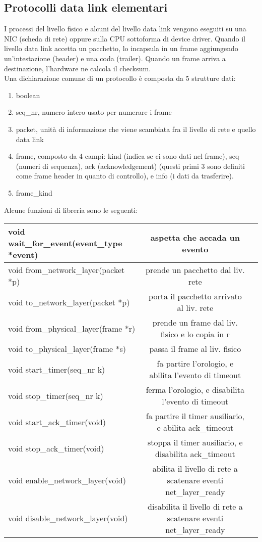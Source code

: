 \documentclass{article}
\begin{document}
\subsection{Protocolli data link elementari}
I processi del livello fisico e alcuni del livello data link vengono eseguiti su una NIC (scheda di rete) oppure sulla CPU sottoforma di device driver. Quando il livello data link accetta un pacchetto, lo incapsula in un frame aggiungendo un'intestazione (header) e una coda (trailer). Quando un frame arriva a destinazione, l'hardware ne calcola il checksum. \\
Una dichiarazione comune di un protocollo è composta da 5 strutture dati:
\begin{enumerate}
\item boolean
\item seq\_nr, numero intero usato per numerare i frame
\item packet, unità di informazione che viene scambiata fra il livello di rete e quello data link
\item frame, composto da 4 campi: kind (indica se ci sono dati nel frame), seq (numeri di sequenza), ack (acknowledgement) (questi primi 3 sono definiti come frame header in quanto di controllo), e info (i dati da trasferire). 
\item frame\_kind
\end{enumerate}
Alcune funzioni di libreria sono le seguenti:\\
\begin{tabular}{|l | c | r}
	\hline
	void wait\_for\_event(event\_type *event) & aspetta che accada un evento \\ \hline
	void from\_network\_layer(packet *p) & prende un pacchetto dal liv. rete\\ \hline
	void to\_network\_layer(packet *p) & porta il pacchetto arrivato al liv. rete \\ \hline
	void from\_physical\_layer(frame *r) & prende un frame dal liv. fisico e lo copia in r \\ \hline
	void to\_physical\_layer(frame *s) & passa il frame al liv. fisico \\ \hline
	void start\_timer(seq\_nr k) & fa partire l'orologio, e abilita l'evento di timeout \\ \hline
	void stop\_timer(seq\_nr k) & ferma l'orologio, e disabilita l'evento di timeout \\ \hline
	void start\_ack\_timer(void) & fa partire il timer ausiliario, e abilita ack\_timeout \\ \hline
		void stop\_ack\_timer(void) & stoppa il timer ausiliario, e disabilita ack\_timeout \\ \hline
		void enable\_network\_layer(void) & abilita il livello di rete a scatenare eventi net\_layer\_ready \\ \hline
		void disable\_network\_layer(void) & disabilita il livello di rete a scatenare eventi net\_layer\_ready \\ \hline
\end{tabular}
\end{document}
